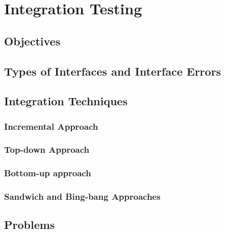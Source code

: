 \setchapterpreamble[u]{\margintoc}
\chapter{Integration Testing}
\section{Objectives}
\section{Types of Interfaces and Interface Errors}
\section{Integration Techniques}
\subsection{Incremental Approach}
\subsection{Top-down Approach}
\subsection{Bottom-up approach}
\subsection{Sandwich and Bing-bang Approaches}
\section{Problems}